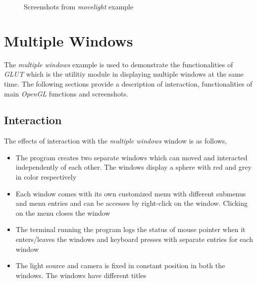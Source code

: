 \documentclass[11pt,a4paper,oneside]{article}
\begin{document}
\begin{figure}[!htbp]
		\qquad
		\qquad
		\caption{Screenshots from \emph{movelight} example}
		\label{fig:movelight}%
	\end{figure}

   
   \section{Multiple Windows}
   The \emph{multiple windows} example is used to demonstrate the functionalities of \emph{GLUT} which is the utilitiy module in displaying multiple windows at the same time. The following sections provide a description of interaction, functionalities of main \emph{OpenGL} functions and screenshots.
   
   
   \subsection{Interaction}
   The effects of interaction with the \emph{multiple windows} window is as follows,
   \begin{itemize}
   	\item The program creates two separate windows which can moved and interacted independently of each other. The windows display a sphere with red and grey in color respectively
   	\item Each window comes with its own customized menu with different submenus and menu entries and can be accesses by right-click on the window. Clicking on the menu closes the window
   	\item The terminal running the program logs the status of mouse pointer when it enters/leaves the windows and keyboard presses with separate entries for each window 
   	\item The light source and camera is fixed in constant position in both the windows. The windows have different titles
   \end{itemize}
   
\end{document}
